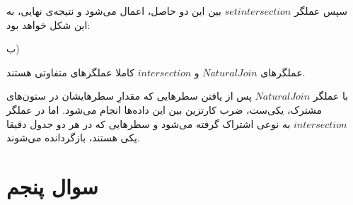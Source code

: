 \begin{LTRbibitems}
\end{LTRbibitems}


\begin{LTRbibitems}
\end{LTRbibitems}

سپس عملگر
$set intersection$
بین این دو حاصل، اعمال می‌شود و نتیجه‌ی نهایی، به این شکل خواهد بود:


\begin{LTRbibitems}


\end{LTRbibitems}


ب)

عملگرهای
$Natural Join$
و
$intersection$
کاملا عملگرهای متفاوتی هستند.

با عملگر
$Natural Join$
پس از یافتن سطرهایی که مقدارِ سطرهایشان در ستون‌های مشترک، یکی‌ست، ضرب کارتزین بین این داده‌ها انجام می‌شود.
اما در عملگر
$intersection$
به نوعی اشتراک گرفته می‌شود و سطرهایی که در هر دو جدول دقیقا یکی هستند، بازگردانده می‌شوند.

\section*{\centering سوال پنجم}

